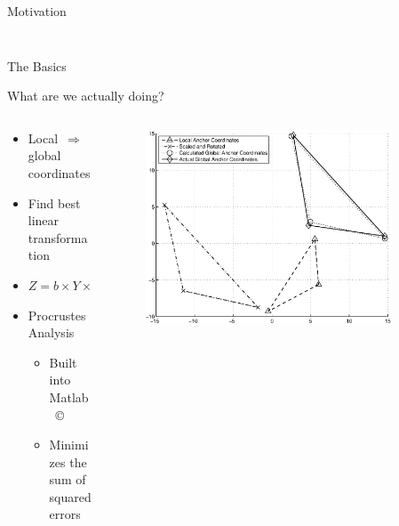 \documentclass{beamer}
\begin{document}
\begin{frame}{Motivation}
\begin{columns}
\begin{column}[T]{0.7\textwidth}
\begin{figure}
		\end{figure}
    \end{column}
\end{columns}
\end{frame}

\begin{frame}{The Basics}
\begin{block}{What are we actually doing?}
\begin{columns}
	\begin{column}[T]{0.3\textwidth}
		\begin{itemize}
		\item Local~$\Rightarrow$ global coordinates
		\item Find best linear transformation
		\item $Z = b \times Y \times T + c$
		\item Procrustes Analysis
			\begin{itemize}
				\item Built into Matlab~\copyright
				\item Minimizes the sum of squared errors
			\end{itemize}
		\end{itemize}
		\vfill
	\end{column}
	\begin{column}[T]{0.7\textwidth}
		\begin{figure}
			\centering	
				\includegraphics[width=0.9\textwidth]{SampleAnchors}
		\end{figure}
	\end{column}
\end{columns}
\end{block}
\end{frame}
\end{document}
